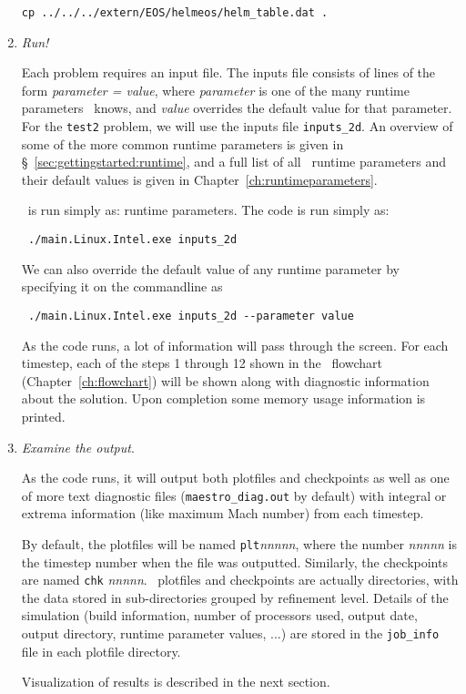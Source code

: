 \begin{enumerate}
\begin{verbatim}
cp ../../../extern/EOS/helmeos/helm_table.dat .
\end{verbatim}


\item {\em Run!}

Each problem requires an input file.  The inputs file consists of
lines of the form {\em parameter = value}, where {\em parameter} is
one of the many runtime parameters \maestro\ knows, and {\em value}
overrides the default value for that parameter.  For the {\tt test2}
problem, we will use the inputs file {\tt inputs\_2d}.  An overview of
some of the more common runtime parameters is given
in \S~\ref{sec:gettingstarted:runtime}, and a full list of
all \maestro\ runtime parameters and their default values is given in
Chapter~\ref{ch:runtimeparameters}.

\maestro\ is run simply as:
runtime parameters.  The code is run simply as:
\begin{verbatim}
 ./main.Linux.Intel.exe inputs_2d
\end{verbatim}
We can also override the default value of any runtime parameter by specifying
it on the commandline as
\begin{verbatim}
 ./main.Linux.Intel.exe inputs_2d --parameter value
\end{verbatim}

As the code runs, a lot of information will pass through the screen.
For each timestep, each of the steps 1 through 12 shown in
the \maestro\ flowchart (Chapter~\ref{ch:flowchart}) will be shown
along with diagnostic information about the solution.  Upon completion
some memory usage information is printed.


\item {\em Examine the output}.

As the code runs, it will output both plotfiles and checkpoints as
well as one of more text diagnostic files ({\tt maestro\_diag.out} by
default) with integral or extrema information (like maximum Mach
number) from each timestep.

By default, the plotfiles will be named {\tt plt}{\em nnnnn}, where
the number {\em nnnnn} is the timestep number when the file was
outputted.  Similarly, the checkpoints are named {\tt chk}{\em
nnnnn}.  \boxlib\ plotfiles and checkpoints are actually directories,
with the data stored in sub-directories grouped by refinement level.
Details of the simulation (build information, number of processors
used, output date, output directory, runtime parameter values, ...)
are stored in the {\tt job\_info} file in each plotfile directory.

Visualization of results is described in the next section.


\end{enumerate}


